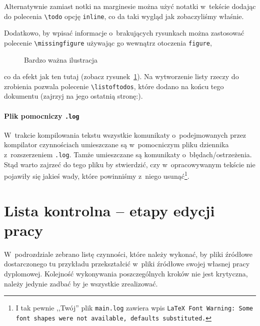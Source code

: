 Alternatywnie zamiast notki na marginesie można użyć notatki w~tekście dodając do polecenia \texttt{\textbackslash todo} opcję \texttt{inline}, co da  taki wygląd jak zobaczyliśmy właśnie.

Dodatkowo, by wpisać informacje o~brakujących rysunkach można zastosować polecenie \texttt{\textbackslash missingfigure} używając go wewnątrz otoczenia \texttt{figure},
\begin{figure}[tp]
  \caption{Bardzo ważna ilustracja}
  \label{fig:tc}
\end{figure}
co da efekt jak ten tutaj (zobacz rysunek~\ref{fig:tc}). Na wytworzenie listy rzeczy do zrobienia pozwala polecenie
\texttt{\textbackslash listoftodos}, które dodano na końcu tego dokumentu (zajrzyj na jego ostatnią stronę:).\vspace{-4.5mm}

\paragraph{Plik pomocniczy \texttt{.log}} W~trakcie kompilowania tekstu wszystkie komunikaty o~podejmowanych przez kompilator czynnościach umieszczane są w~pomocniczym pliku dziennika z~rozszerzeniem \texttt{.log}. Tamże umieszczane są komunikaty o~błę\-dach/o\-strze\-że\-nia. Stąd warto zajrzeć do tego pliku by stwierdzić, czy w~opracowywanym tekście nie pojawiły się jakieś wady, które powinniśmy z~niego usunąć\footnote{I tak pewnie ,,Twój'' plik \texttt{main.log} zawiera wpis \texttt{LaTeX Font Warning: Some font shapes were not available, defaults substituted.} \smiley}.

\section{Lista kontrolna -- etapy edycji pracy}
\label{sec:listakontrolna}

W~podrozdziale zebrano listę czynności, które należy wykonać, by pliki źródłowe dostarczonego tu przykładu przekształcić w~pliki źródłowe swojej własnej pracy dyplomowej. Kolejność wykonywania poszczególnych kroków nie jest krytyczna, należy jedynie zadbać by je wszystkie zrealizować.

